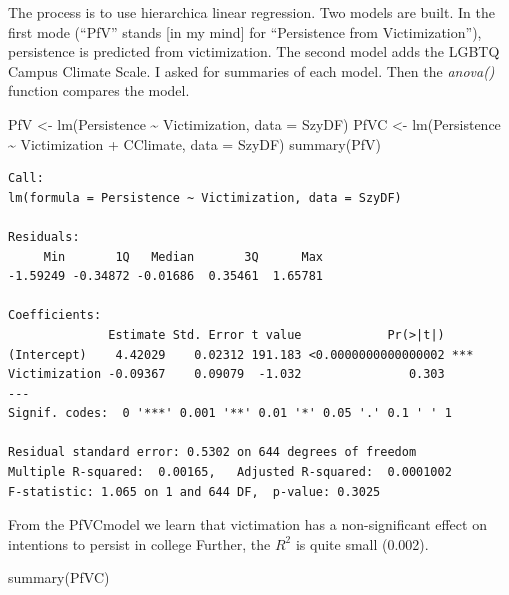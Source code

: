 \documentclass[
  english,
]{book}
\newenvironment{Shaded}{\begin{snugshade}}{\end{snugshade}}
\newcommand{\AttributeTok}[1]{\textcolor[rgb]{0.77,0.63,0.00}{#1}}
\newcommand{\FunctionTok}[1]{\textcolor[rgb]{0.00,0.00,0.00}{#1}}
\newcommand{\NormalTok}[1]{#1}
\newcommand{\OtherTok}[1]{\textcolor[rgb]{0.56,0.35,0.01}{#1}}
\newcommand{\SpecialCharTok}[1]{\textcolor[rgb]{0.00,0.00,0.00}{#1}}
\begin{document}
The process is to use hierarchica linear regression. Two models are built. In the first mode (``PfV'' stands {[}in my mind{]} for ``Persistence from Victimization''), persistence is predicted from victimization. The second model adds the LGBTQ Campus Climate Scale. I asked for summaries of each model. Then the \emph{anova()} function compares the model.

\begin{Shaded}
\begin{Highlighting}[]
\NormalTok{PfV }\OtherTok{\textless{}{-}} \FunctionTok{lm}\NormalTok{(Persistence }\SpecialCharTok{\textasciitilde{}}\NormalTok{ Victimization, }\AttributeTok{data =}\NormalTok{ SzyDF)}
\NormalTok{PfVC }\OtherTok{\textless{}{-}} \FunctionTok{lm}\NormalTok{(Persistence }\SpecialCharTok{\textasciitilde{}}\NormalTok{ Victimization }\SpecialCharTok{+}\NormalTok{ CClimate, }\AttributeTok{data =}\NormalTok{ SzyDF)}
\FunctionTok{summary}\NormalTok{(PfV)}
\end{Highlighting}
\end{Shaded}

\begin{verbatim}
Call:
lm(formula = Persistence ~ Victimization, data = SzyDF)

Residuals:
     Min       1Q   Median       3Q      Max 
-1.59249 -0.34872 -0.01686  0.35461  1.65781 

Coefficients:
              Estimate Std. Error t value            Pr(>|t|)    
(Intercept)    4.42029    0.02312 191.183 <0.0000000000000002 ***
Victimization -0.09367    0.09079  -1.032               0.303    
---
Signif. codes:  0 '***' 0.001 '**' 0.01 '*' 0.05 '.' 0.1 ' ' 1

Residual standard error: 0.5302 on 644 degrees of freedom
Multiple R-squared:  0.00165,   Adjusted R-squared:  0.0001002 
F-statistic: 1.065 on 1 and 644 DF,  p-value: 0.3025
\end{verbatim}

From the PfVCmodel we learn that victimation has a non-significant effect on intentions to persist in college Further, the \(R^2\) is quite small (0.002).

\begin{Shaded}
\begin{Highlighting}[]
\FunctionTok{summary}\NormalTok{(PfVC)}
\end{Highlighting}
\end{Shaded}
\end{document}
